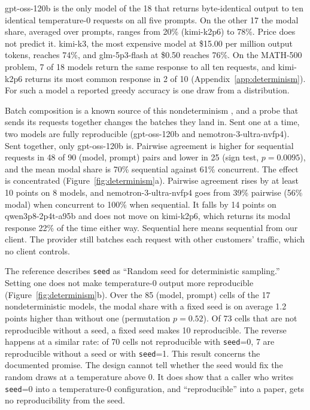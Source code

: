 \documentclass[10pt]{article}
\newcommand{\p}[1]{\texttt{#1}}
\begin{document}
gpt-oss-120b is the only model of the 18 that returns byte-identical output to ten identical temperature-0 requests on all five prompts. On the other 17 the modal share, averaged over prompts, ranges from 20\% (kimi-k2p6) to 78\%. Price does not predict it. kimi-k3, the most expensive model at \$15.00 per million output tokens, reaches 74\%, and glm-5p3-flash at \$0.50 reaches 76\%. On the MATH-500 problem, 7 of 18 models return the same response to all ten requests, and kimi-k2p6 returns its most common response in 2 of 10 (Appendix~\ref{app:determinism}). For such a model a reported greedy accuracy is one draw from a distribution.

Batch composition is a known source of this nondeterminism \citep{he2025defeating}, and a probe that sends its requests together changes the batches they land in. Sent one at a time, two models are fully reproducible (gpt-oss-120b and nemotron-3-ultra-nvfp4). Sent together, only gpt-oss-120b is. Pairwise agreement is higher for sequential requests in 48 of 90 (model, prompt) pairs and lower in 25 (sign test, $p = 0.0095$), and the mean modal share is 70\% sequential against 61\% concurrent. The effect is concentrated (Figure~\ref{fig:determinism}a). Pairwise agreement rises by at least 10 points on 8 models, and nemotron-3-ultra-nvfp4 goes from 39\% pairwise (56\% modal) when concurrent to 100\% when sequential. It falls by 14 points on qwen3p8-2p4t-a95b and does not move on kimi-k2p6, which returns its modal response 22\% of the time either way. Sequential here means sequential from our client. The provider still batches each request with other customers' traffic, which no client controls.

The reference describes \p{seed} as ``Random seed for deterministic sampling.'' Setting one does not make temperature-0 output more reproducible (Figure~\ref{fig:determinism}b). Over the 85 (model, prompt) cells of the 17 nondeterministic models, the modal share with a fixed seed is on average 1.2 points higher than without one (permutation $p = 0.52$). Of 73 cells that are not reproducible without a seed, a fixed seed makes 10 reproducible. The reverse happens at a similar rate: of 70 cells not reproducible with \p{seed}=0, 7 are reproducible without a seed or with \p{seed}=1. This result concerns the documented promise. The design cannot tell whether the seed would fix the random draws at a temperature above 0. It does show that a caller who writes \p{seed}=0 into a temperature-0 configuration, and ``reproducible'' into a paper, gets no reproducibility from the seed.
\end{document}

